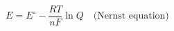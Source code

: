 \documentclass[preview]{standalone}
\begin{document}
\[E = E^\circ - \frac{RT}{nF}\ln Q \quad \text{(Nernst equation)}\]
\end{document}
